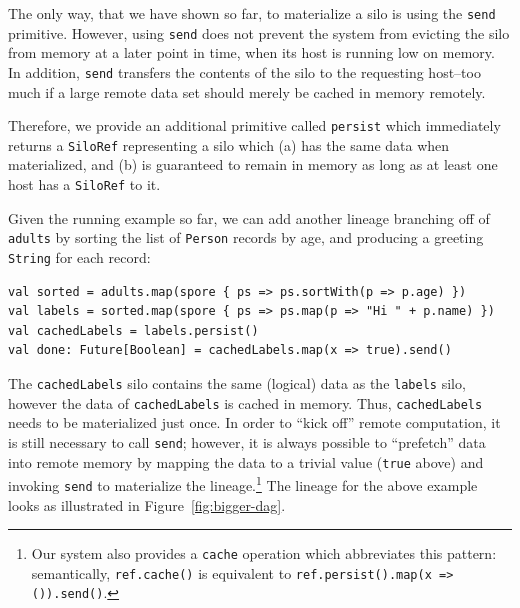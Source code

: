 \documentclass{jfp1}
\begin{document}
The only way, that we have shown so far, to materialize a silo is
using the \verb|send| primitive. However, using \verb|send| does not
prevent the system from evicting the silo from memory at a later point
in time, \eg when its host is running low on memory. In addition,
\verb|send| transfers the contents of the silo to the requesting
host--too much if a large remote data set should merely be cached in
memory remotely.

Therefore, we provide an additional primitive called \verb|persist|
which immediately returns a \verb|SiloRef| representing a silo which
(a) has the same data when materialized, and (b) is guaranteed to
remain in memory as long as at least one host has a \verb|SiloRef| to
it.

Given the running example so far, we can add another lineage branching
off of \verb|adults| by sorting the list of \verb|Person| records by
age, and producing a greeting \verb|String| for each record:

\begin{lstlisting}
val sorted = adults.map(spore { ps => ps.sortWith(p => p.age) })
val labels = sorted.map(spore { ps => ps.map(p => "Hi " + p.name) })
val cachedLabels = labels.persist()
val done: Future[Boolean] = cachedLabels.map(x => true).send()
\end{lstlisting}
\noindent
The \verb|cachedLabels| silo contains the same (logical) data as the
\verb|labels| silo, however the data of \verb|cachedLabels| is cached
in memory. Thus, \verb|cachedLabels| needs to be materialized just
once. In order to ``kick off'' remote computation, it is still
necessary to call \verb|send|; however, it is always possible to
``prefetch'' data into remote memory by mapping the data to a trivial
value (\verb|true| above) and invoking \verb|send| to materialize the
lineage.\footnote{Our system also provides a \texttt{cache} operation
  which abbreviates this pattern: semantically, \texttt{ref.cache()}
  is equivalent to \texttt{ref.persist().map(x => ()).send()}.} The
lineage for the above example looks as illustrated in
Figure~\ref{fig:bigger-dag}.


\end{document}
